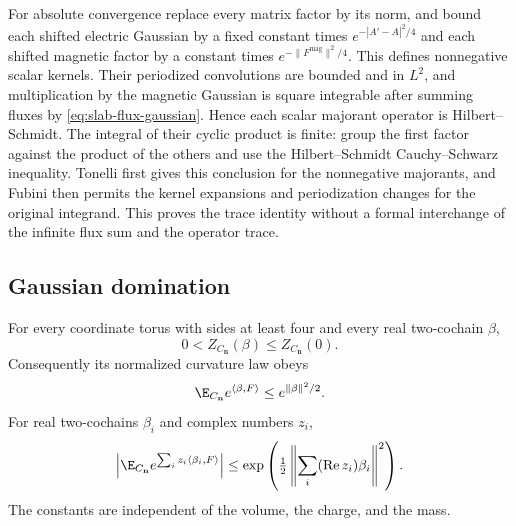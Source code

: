 For absolute convergence replace every matrix factor by its norm,
and bound each shifted electric Gaussian by a fixed constant times
$e^{-|A'-A|^2/4}$ and each shifted magnetic factor by a constant
times $e^{-\|F^{\mathrm{mag}}\|^2/4}$. This defines nonnegative
scalar kernels. Their periodized convolutions are bounded and in
$L^2$, and multiplication by the magnetic Gaussian is square
integrable after summing fluxes by \eqref{eq:slab-flux-gaussian}.
Hence each scalar majorant operator is Hilbert--Schmidt. The
integral of their cyclic product is finite: group the first factor
against the product of the others and use the Hilbert--Schmidt
Cauchy--Schwarz inequality. Tonelli first gives this conclusion
for the nonnegative majorants, and Fubini then permits the kernel
expansions and periodization changes for the original integrand.
This proves the trace identity without a formal interchange of
the infinite flux sum and the operator trace.

\subsection{Gaussian domination}\label{subsec:slab-gaussian}

\begin{proposition}\label{thm:slab-gaussian}
For every coordinate torus with sides at least four and every real
two-cochain $\beta$,
\begin{equation}\label{eq:slab-gaussian-partition}
 0<Z_{C_{\mathbf n}}(\beta)\le Z_{C_{\mathbf n}}(0).
\end{equation}
Consequently its normalized curvature law obeys
\begin{equation}\label{eq:slab-gaussian-domination}
 \E_{C_{\mathbf n}}e^{\langle\beta,F\rangle}
                              \le e^{\|\beta\|^2/2}.
\end{equation}
For real two-cochains $\beta_i$ and complex numbers $z_i$,
\begin{equation}\label{eq:slab-complex-gaussian}
 \left|\E_{C_{\mathbf n}}e^{\sum_i z_i\langle\beta_i,F\rangle}\right|
       \le\exp\left(\tfrac12
                    \left\|\sum_i(\operatorname{Re}z_i)\beta_i\right\|^2\right).
\end{equation}
The constants are independent of the volume, the charge, and the mass.
\end{proposition}

